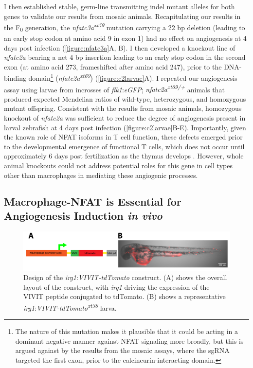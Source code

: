 I then established stable, germ\hyp{}line transmitting indel mutant alleles for both genes to validate our results from mosaic animals. Recapitulating our results in the F\textsubscript{0} generation, the \textit{nfatc3a\textsuperscript{xt59}} mutation carrying a 22 bp deletion (leading to an early stop codon at amino acid 9 in exon 1) had no effect on angiogenesis at 4 days post infection (\autoref{figure:nfatc3a}A, B). I then developed a knockout line of \textit{nfatc2a} bearing a net 4 bp insertion leading to an early stop codon in the second exon (at amino acid 273, frameshifted after amino acid 247), prior to the DNA\hyp{}binding domain\footnote{The nature of this mutation makes it plausible that it could be acting in a dominant negative manner against NFAT signaling more broadly, but this is argued against by the results from the mosaic assays, where the sgRNA targeted the first exon, prior to the calcineurin\hyp{}interacting domain.} (\textit{nfatc2a\textsuperscript{xt69}}) (\autoref{figure:c2larvae}A). I repeated our angiogenesis assay using larvae from incrosses of \textit{flk1}:\textit{eGFP}; \textit{nfatc2a\textsuperscript{xt69/+}} animals that produced expected Mendelian ratios of wild\hyp{}type, heterozygous, and homozygous mutant offspring. Consistent with the results from mosaic animals, homozygous knockout of \textit{nfatc2a} was sufficient to reduce the degree of angiogenesis present in larval zebrafish at 4 days post infection (\autoref{figure:c2larvae}B\hyp{}E). Importantly, given the known role of NFAT isoforms in T cell function, these defects emerged prior to the developmental emergence of functional T cells, which does not occur until approximately 6 days post fertilization as the thymus develops \citep{Trede2004}. However, whole animal knockouts could not address potential roles for this gene in cell types other than macrophages in mediating these angiogenic processes. 

\subsection{Macrophage\hyp{}NFAT is Essential for Angiogenesis Induction \textit{in vivo}}

\begin{figure}
\centering
\includegraphics[width=\textwidth]{images/vivitconstruct.pdf}
\caption[Design of \textit{irg1}:\textit{VIVIT\hyp{}tdTomato}]{Design of the \textit{irg1}:\textit{VIVIT\hyp{}tdTomato} construct. (A) shows the overall layout of the construct, with \textit{irg1} driving the expression of the VIVIT peptide conjugated to tdTomato. (B) shows a representative \textit{irg1}:\textit{VIVIT\hyp{}tdTomato\textsuperscript{xt38}} larva.}
\label{figure:vivitdiagram}
\end{figure}

